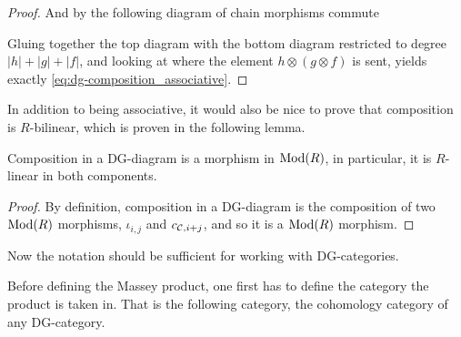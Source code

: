 \begin{proof}
    And by \cite[Definition 6.2.1]{Borceux_1994} the following diagram of chain morphisms commute
    \begin{center}
    \end{center}
    Gluing together the top diagram with the bottom diagram restricted to degree \( |h| + |g| + |f| \), and looking at where the element \( h \otimes (g \otimes f) \) is sent, yields exactly \autoref{eq:dg-composition_associative}.
\end{proof}

In addition to being associative, it would also be nice to prove that composition is \( R \)-bilinear, which is proven in the following lemma.

\begin{lemma}
    Composition in a DG-diagram is a morphism in \( \operatorname{Mod}(R) \), in particular, it is \( R \)-linear in both components.
\end{lemma}
\begin{proof}
    By definition, composition in a DG-diagram is the composition of two \( \operatorname{Mod}(R) \) morphisms, \( \iota_{i, j} \) and \( c_{{\mathcal{C}}, i + j} \), and so it is a \( \operatorname{Mod}(R) \) morphism.
\end{proof}

Now the notation should be sufficient for working with DG-categories.

Before defining the Massey product, one first has to define the category the product is taken in. That is the following category, the cohomology category of any DG-category.

